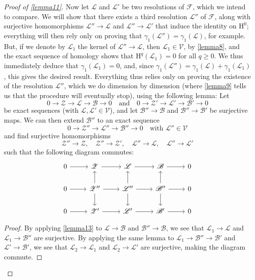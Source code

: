 \documentclass{article}
\theoremstyle{plain}
\newenvironment{lemma}[1]
    {\renewcommand\theinnercustomlemma{#1}\innercustomlemma}
    {\endinnercustomlemma}
\theoremstyle{definition}
\newcommand{\sh}{\mathscr}
\newcommand{\cat}{\mathcal}
\newcommand{\HH}{\mathrm{H}}
\renewcommand{\geq}{\geqslant}
\newcommand{\oldpage}[1]{\marginpar{\footnotesize$\Big\vert$ \textit{p.~#1}}}
\begin{document}
\begin{proof}[Proof of \cref{lemma11}]
  Now let $\sh{L}$ and $\sh{L}'$ be two resolutions of $\sh{F}$, which we intend to compare.
  We will show that there exists a third resolution $\sh{L}''$ of $\sh{F}$, along with surjective homomorphisms $\sh{L}''\to\sh{L}$ and $\sh{L}''\to\sh{L}'$ that induce the identity on $\HH^0$;
  everything will then rely only on proving that $\gamma_1(\sh{L}'')=\gamma_1(\sh{L})$, for example.
  But, if we denote by $\sh{L}_1$ the kernel of $\sh{L}''\to\sh{L}$, then $\sh{L}_1\in\cat{V}$, by \cref{lemma8}, and the exact sequence of homology shows that $\HH^q(\sh{L}_1)=0$ for all $q\geq0$.
  We thus immediately deduce that $\gamma_1(\sh{L}_1)=0$, and, since $\gamma_1(\sh{L}'')=\gamma_1(\sh{L})+\gamma_1(\sh{L}_1)$, this gives the desired result.
  Everything thus relies only on proving the existence of the resolution $\sh{L}''$, which we do dimension by dimension (where \cref{lemma9} tells us that the procedure will eventually stop), using the following lemma:
  \begin{lemma}{14}
  \label{lemma14}
    Let
    \[
      0\to\sh{Z}\to\sh{L}\to\sh{B}\to0
      \quad\text{and}\quad
      0\to\sh{Z}'\to\sh{L}'\to\sh{B}'\to0
    \]
    be exact sequences (with $\sh{L},\sh{L}'\in\cat{V}$), and let $\sh{B}''\to\sh{B}$ and $\sh{B}''\to\sh{B}'$ be surjective maps.
    We can then extend $\sh{B}''$ to an exact sequence
    \[
      0\to\sh{Z}''\to\sh{L}''\to\sh{B}''\to0
      \quad
      \mbox{with $\sh{L}''\in\cat{V}$}
    \]
    and find surjective homomorphisms
    \[
      \sh{Z}''\to\sh{Z},
      \quad
      \sh{Z}''\to\sh{Z}',
      \quad
      \sh{L}''\to\sh{L},
      \quad
      \sh{L}''\to\sh{L}'
    \]
    such that the following diagram commutes:
    \[
      \begin{tikzcd}
        0 \rar
        & \sh{Z} \rar
        & \sh{L} \rar
        & \sh{B} \rar
        & 0
      \\0 \rar
        & \sh{Z}'' \rar \uar \dar
        & \sh{L}'' \rar \uar \dar
        & \sh{B}'' \rar \uar \dar
        & 0
      \\0 \rar
        & \sh{Z}' \rar
        & \sh{L}' \rar
        & \sh{B}' \rar
        & 0
      \end{tikzcd}
    \]
  \end{lemma}
  \begin{proof}
\oldpage{108}
    By applying \cref{lemma13} to $\sh{L}\to\sh{B}$ and $\sh{B}''\to\sh{B}$, we see that $\sh{L}_1\to\sh{L}$ and $\sh{L}_1\to\sh{B}''$ are surjective.
    By applying the same lemma to $\sh{L}_1\to\sh{B}''\to\sh{B}'$ and $\sh{L}'\to\sh{B}'$, we see that $\sh{L}_2\to\sh{L}_1$ and $\sh{L}_2\to\sh{L}'$ are surjective, making the diagram commute.


\end{proof}
\end{proof}
\end{document}
